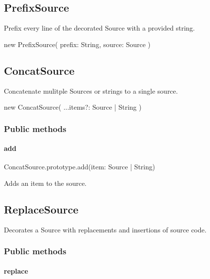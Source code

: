 \subsection*{{\ttfamily Prefix\+Source}}

Prefix every line of the decorated {\ttfamily Source} with a provided string.


\begin{DoxyCode}
new PrefixSource(
    prefix: String,
    source: Source
)
\end{DoxyCode}


\subsection*{{\ttfamily Concat\+Source}}

Concatenate mulitple {\ttfamily Source}s or strings to a single source.


\begin{DoxyCode}
new ConcatSource(
    ...items?: Source | String
)
\end{DoxyCode}


\subsubsection*{Public methods}

\paragraph*{{\ttfamily add}}


\begin{DoxyCode}
ConcatSource.prototype.add(item: Source | String)
\end{DoxyCode}


Adds an item to the source.

\subsection*{{\ttfamily Replace\+Source}}

Decorates a {\ttfamily Source} with replacements and insertions of source code.

\subsubsection*{Public methods}

\paragraph*{{\ttfamily replace}}


